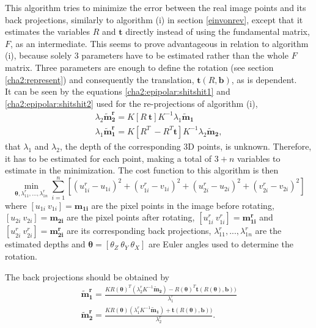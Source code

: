 This algorithm tries to minimize the error between the real image points and its back projections, similarly to algorithm (i) in section \ref{einvonrev}, except that it estimates the variables $R$ and $\mathbf{t}$ directly instead of using the fundamental matrix, $F$, as an intermediate. This seems to prove advantageous in relation to algorithm (i), because solely 3 parameters have to be estimated rather than the whole $F$ matrix. Three parameters are enough to define the rotation (see section \ref{cha2:represent}) and consequently the translation, $\mathbf{t}(R, \mathbf{b})$, as is dependent.\\
It can be seen by the equations \ref{cha2:epipolar:shitshit1} and \ref{cha2:epipolar:shitshit2} used for the re-projections of algorithm (i),
\begin{align}
	\lambda_2 \mathbf{\tilde{m}^r_2} = K [ R \ \mathbf{t} ] K^{-1} \lambda_1 \mathbf{\tilde{m}_1}\\
	\lambda_1 \mathbf{\tilde{m}^r_1} =  K [ R^{T} \ -R^{T}\mathbf{t} ]K^{-1} \lambda_2 \mathbf{\tilde{m}_2},
\end{align}
that $\lambda_1$ and $\lambda_2$, the depth of the corresponding 3D points, is unknown. Therefore, it has to be estimated for each point, making a total of $3+n$ variables to estimate in the minimization.
The cost function to this algorithm is then
\begin{equation}
	\min_{\mathbf{\theta}, \lambda^r_{11}, ..., \lambda^r_{1n}} \sum^n_{i=1} [(u^r_{1i}-u_{1i})^2  + (v^r_{1i}-v_{1i})^2 + (u^r_{2i}-u_{2i})^2 + (v^r_{2i}-v_{2i})^2]
\end{equation}
where $[u_{1i} \ v_{1i}] = \mathbf{m_{1i}}$ are the pixel points in the image before rotating, $[u_{2i} \ v_{2i}] = \mathbf{m_{2i}}$ are the pixel points after rotating, $[u_{1i}^r \ v_{1i}^r] = \mathbf{m_{1i}^r}$ and $[u_{2i}^r \ v_{2i}^r] = \mathbf{m_{2i}^r}$ are its corresponding back projections, $\lambda^r_{11}, ..., \lambda^r_{1n}$ are the estimated depths and $\mathbf{\theta} = [\theta_Z \ \theta_Y \ \theta_X]$ are Euler angles used to determine the rotation.

The back projections should be obtained by
\begin{align*}
	\mathbf{\tilde{m}_{1}^r} = \frac{KR(\mathbf{ \theta})^T(\lambda_{2}^r K^{-1}\mathbf{\tilde{m}_2}) - R(\mathbf{ \theta})^T \mathbf{t}(R(\mathbf{ \theta}), \mathbf{b}))}{\lambda_{1}^r}\\
	\mathbf{\tilde{m}_{2}^r} = \frac{KR(\mathbf{ \theta})(\lambda_{1}^r K^{-1}\mathbf{\tilde{m}_1}) + \mathbf{t}(R(\mathbf{ \theta}), \mathbf{b}))}{\lambda_{2}^r}.
\end{align*} 

